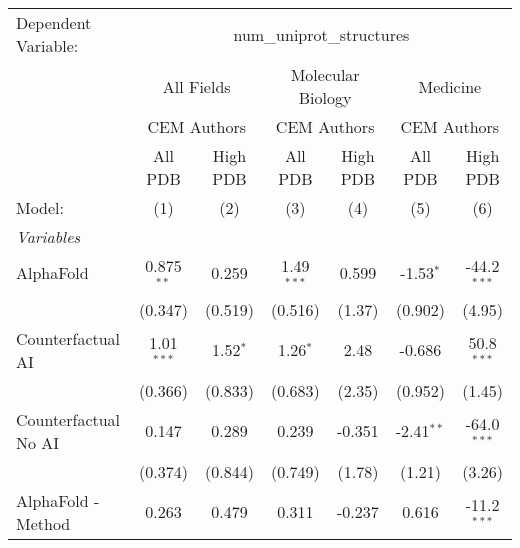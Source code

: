 \begingroup
\centering
\begin{tabular}{lcccccc}
   \tabularnewline \midrule \midrule
   Dependent Variable: & \multicolumn{6}{c}{num\_uniprot\_structures}\\
 & \multicolumn{2}{c}{All Fields} & \multicolumn{2}{c}{Molecular Biology} & \multicolumn{2}{c}{Medicine} \\
\cmidrule(lr){2-3} \cmidrule(lr){4-5} \cmidrule(lr){6-7}
 & \multicolumn{2}{c}{CEM Authors} & \multicolumn{2}{c}{CEM Authors} & \multicolumn{2}{c}{CEM Authors} \\
\cmidrule(lr){2-3} \cmidrule(lr){4-5} \cmidrule(lr){6-7}
 & \multicolumn{1}{c}{All PDB} & \multicolumn{1}{c}{High PDB} & \multicolumn{1}{c}{All PDB} & \multicolumn{1}{c}{High PDB} & \multicolumn{1}{c}{All PDB} & \multicolumn{1}{c}{High PDB} \\
\cmidrule(lr){2-2} \cmidrule(lr){3-3} \cmidrule(lr){4-4} \cmidrule(lr){5-5} \cmidrule(lr){6-6} \cmidrule(lr){7-7}
   Model:                                                     & (1)           & (2)           & (3)           & (4)        & (5)          & (6)\\  
   \midrule
   \emph{Variables}\\
   AlphaFold                                                  & 0.875$^{**}$  & 0.259         & 1.49$^{***}$  & 0.599      & -1.53$^{*}$  & -44.2$^{***}$\\   
                                                              & (0.347)       & (0.519)       & (0.516)       & (1.37)     & (0.902)      & (4.95)\\   
   Counterfactual AI                                          & 1.01$^{***}$  & 1.52$^{*}$    & 1.26$^{*}$    & 2.48       & -0.686       & 50.8$^{***}$\\   
                                                              & (0.366)       & (0.833)       & (0.683)       & (2.35)     & (0.952)      & (1.45)\\   
   Counterfactual No AI                                       & 0.147         & 0.289         & 0.239         & -0.351     & -2.41$^{**}$ & -64.0$^{***}$\\   
                                                              & (0.374)       & (0.844)       & (0.749)       & (1.78)     & (1.21)       & (3.26)\\   
   AlphaFold - Method                                         & 0.263         & 0.479         & 0.311         & -0.237     & 0.616        & -11.2$^{***}$\\   

\end{tabular}
